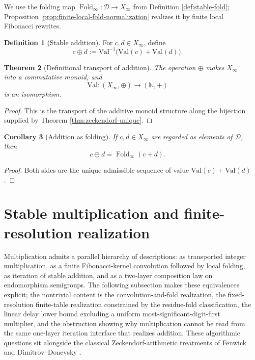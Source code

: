 \documentclass[12pt,a4paper]{article}
\theoremstyle{plain}
\newtheorem{theorem}{Theorem}[section]
\newtheorem{corollary}[theorem]{Corollary}
\theoremstyle{definition}
\newtheorem{definition}[theorem]{Definition}
\numberwithin{equation}{section}
\newcommand{\NN}{\mathbb{N}}
\newcommand{\Fold}{\operatorname{Fold}}
\begin{document}
We use the folding map \(\Fold_\infty:\mathcal{D}\to X_\infty\) from Definition \ref{def:stable-fold}; Proposition \ref{prop:finite-local-fold-normalization} realizes it by finite local Fibonacci rewrites.

\begin{definition}[Stable addition]\label{def:stable-add}
For \(c,d\in X_\infty\), define
\[
c\oplus d:=\mathrm{Val}^{-1}\bigl(\mathrm{Val}(c)+\mathrm{Val}(d)\bigr).
\]
\end{definition}

\begin{theorem}[Definitional transport of addition]\label{thm:add-definitional}
The operation \(\oplus\) makes \(X_\infty\) into a commutative monoid, and
\[
\mathrm{Val}:(X_\infty,\oplus)\longrightarrow (\NN,+)
\]
is an isomorphism.
\end{theorem}

\begin{proof}
This is the transport of the additive monoid structure along the bijection supplied by Theorem \ref{thm:zeckendorf-unique}.
\end{proof}

\begin{corollary}[Addition as folding]\label{cor:add-as-fold}
If \(c,d\in X_\infty\) are regarded as elements of \(\mathcal{D}\), then
\[
c\oplus d=\Fold_\infty(c+d).
\]
\end{corollary}

\begin{proof}
Both sides are the unique admissible sequence of value \(\mathrm{Val}(c)+\mathrm{Val}(d)\).
\end{proof}



\section{Stable multiplication and finite-resolution realization}\label{sec:stable-mul}

Multiplication admits a parallel hierarchy of descriptions: as transported integer multiplication, as a finite Fibonacci-kernel convolution followed by local folding, as iteration of stable addition, and as a two-layer composition law on endomorphism semigroups. The following subsection makes these equivalences explicit; the nontrivial content is the convolution-and-fold realization, the fixed-resolution finite-table realization constrained by the residue-fold classification, the linear delay lower bound excluding a uniform most-significant-digit-first multiplier, and the obstruction showing why multiplication cannot be read from the same one-layer iteration interface that realizes addition. These algorithmic questions sit alongside the classical Zeckendorf-arithmetic treatments of Fenwick \cite{Fenwick2003ZeckendorfArithmetic} and Dimitrov--Donevsky \cite{DimitrovDonevsky1995FasterMultiplication}.
\end{document}
